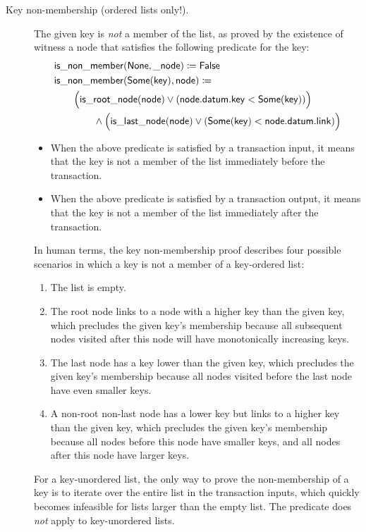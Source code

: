 \documentclass[../midgard.tex]{subfiles}
\begin{document}
\begin{description}
    \item[Key non-membership (ordered lists only!).] The given key is \emph{not} a member of the list, as proved by the existence of witness a node that satisfies the following predicate for the key:
        \begin{align*}
            &\mathsf{is\_non\_member} (\mathsf{None}, \mathsf{\_node}) \coloneq \mathsf{False} \\
            &\mathsf{is\_non\_member} (\mathsf{Some}(\mathsf{key}), \mathsf{node}) \coloneq \\
            &\qquad
                \Bigl( \mathsf{is\_root\_node} (\mathsf{node}) 
                    \lor (\mathsf{node.datum.key} < \mathsf{Some}(\mathsf{key})) \Bigr) \\
            &\qquad\qquad\land
                \Bigl( \mathsf{is\_last\_node} (\mathsf{node}) 
                    \lor (\mathsf{Some}(\mathsf{key}) < \mathsf{node.datum.link}) \Bigr)
        \end{align*}
        \begin{itemize}
            \item When the above predicate is satisfied by a transaction input, it means that the key is not a member of the list immediately before the transaction.
            \item When the above predicate is satisfied by a transaction output, it means that the key is not a member of the list immediately after the transaction.
        \end{itemize}
    In human terms, the key non-membership proof describes four possible scenarios in which a key is not a member of a key-ordered list:
    \begin{enumerate}
        \item The list is empty.
        \item The root node links to a node with a higher key than the given key, which precludes the given key's membership because all subsequent nodes visited after this node will have monotonically increasing keys.
        \item The last node has a key lower than the given key, which precludes the given key's membership because all nodes visited before the last node have even smaller keys.
        \item A non-root non-last node has a lower key but links to a higher key than the given key, which precludes the given key's membership because all nodes before this node have smaller keys, and all nodes after this node have larger keys.
    \end{enumerate}
    For a key-unordered list, the only way to prove the non-membership of a key is to iterate over the entire list in the transaction inputs, which quickly becomes infeasible for lists larger than the empty list.
    The  predicate does \emph{not} apply to key-unordered lists.
\end{description}
\end{document}
